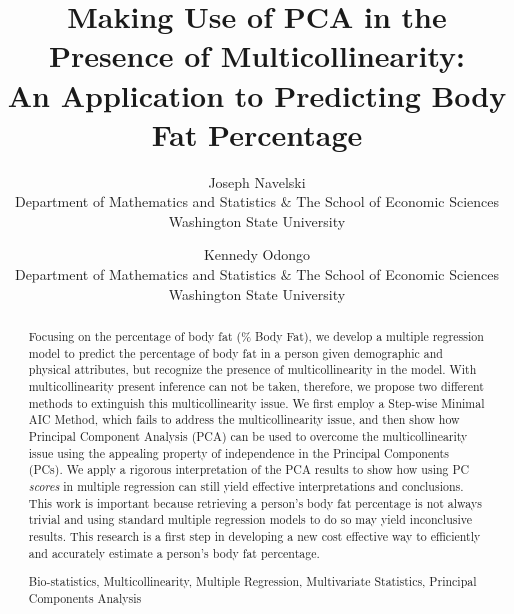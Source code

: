 \documentclass[letterpaper, 12pt]{article}
\begin{document}
	
	\title{Making Use of PCA in the Presence of Multicollinearity:\\
		\bigskip
		An Application to Predicting Body Fat Percentage
		\bigskip}
	
	\author{{\Large Joseph Navelski}\\
	{\normalsize Department of Mathematics and Statistics $\&$ The School of Economic Sciences}\\
	{\normalsize Washington State University}\\
	\and
	{\Large Kennedy Odongo}\\
	{\normalsize Department of Mathematics and Statistics $\&$ The School of Economic Sciences}\\
	{\normalsize Washington State University}
	\bigskip}
	
	\maketitle
	
	\singlespace
	
	\begin{abstract}
		\noindent 
		Focusing on the percentage of body fat ($\%$ Body Fat), we develop a multiple regression model to predict the percentage of body fat in a person given demographic and physical attributes, but recognize the presence of multicollinearity in the model.  With multicollinearity present inference can not be taken, therefore, we propose two different methods to extinguish this multicollinearity issue.  We first employ a Step-wise Minimal AIC Method, which fails to address the multicollinearity issue, and then show how Principal Component Analysis (PCA) can be used to overcome the multicollinearity issue using the appealing property of independence in the Principal Components (PCs).  We apply a rigorous interpretation of the PCA results to show how using PC \textit{scores} in multiple regression can still yield effective interpretations and conclusions.  This work is important because retrieving a person's body fat percentage is not always trivial and using standard multiple regression models to do so may yield inconclusive results.  This research is a first step in developing a new cost effective way to efficiently and accurately estimate a person's body fat percentage.
		\bigskip
		
		 Bio-statistics, Multicollinearity, Multiple Regression, Multivariate Statistics, Principal Components Analysis
	\end{abstract}
	
\end{document}
